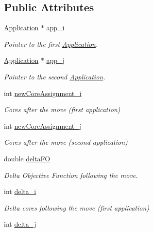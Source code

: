 \subsection*{Public Attributes}
\begin{DoxyCompactItemize}
\item 
\hyperlink{classApplication}{Application} $\ast$ \hyperlink{classCandidate_a1bfed0429bba41f57dce0fbd37225c2c}{app\-\_\-i}
\begin{DoxyCompactList}\small\item\em Pointer to the first \hyperlink{classApplication}{Application}. \end{DoxyCompactList}\item 
\hyperlink{classApplication}{Application} $\ast$ \hyperlink{classCandidate_a8b0f26e8b45e9a3331be8a9694d3be5e}{app\-\_\-j}
\begin{DoxyCompactList}\small\item\em Pointer to the second \hyperlink{classApplication}{Application}. \end{DoxyCompactList}\item 
int \hyperlink{classCandidate_a859313416296683b7c0496d842dab48a}{new\-Core\-Assignment\-\_\-i}
\begin{DoxyCompactList}\small\item\em Cores after the move (first application) \end{DoxyCompactList}\item 
int \hyperlink{classCandidate_a1203966358bd849169b5f967de3c2bf7}{new\-Core\-Assignment\-\_\-j}
\begin{DoxyCompactList}\small\item\em Cores after the move (second application) \end{DoxyCompactList}\item 
double \hyperlink{classCandidate_a1bfc07aae3b3914bba57e057936399e7}{delta\-F\-O}
\begin{DoxyCompactList}\small\item\em Delta Objective Function following the move. \end{DoxyCompactList}\item 
int \hyperlink{classCandidate_ab1033e1f3e0060f0773c7d9268c2ce0b}{delta\-\_\-i}
\begin{DoxyCompactList}\small\item\em Delta cores following the move (first application) \end{DoxyCompactList}\item 
int \hyperlink{classCandidate_a02528143e2448bfcad797aae2fe1ac90}{delta\-\_\-j}

\end{DoxyCompactItemize}
